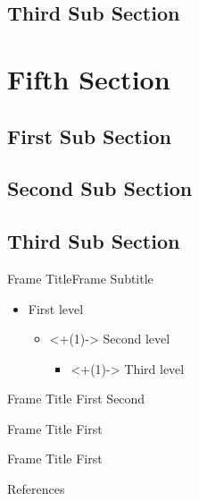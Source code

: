 \documentclass[169,9pt]{beamer}
\begin{document}
\subsection{Third Sub Section}\subsectionFrame

\section{Fifth Section}
\subsection{First Sub Section}
\subsection{Second Sub Section}
\subsection{Third Sub Section}


\begin{frame}{Frame Title}{Frame Subtitle}
    \begin{itemize}
        \item First level
              \begin{itemize}
                  \item<+(1)-> Second level
                      \begin{itemize}
                          \item<+(1)-> Third level
                      \end{itemize}
              \end{itemize}
    \end{itemize}
\end{frame}

\begin{frame}{Frame Title}
    First
    \pause
    Second
\end{frame}


\begin{frame}{Frame Title}
    First
\end{frame}


\begin{frame}{Frame Title}
    First
\end{frame}

\begin{frame}[allowframebreaks]{References}
    \printbibliography
\end{frame}

\appendix

\end{document}
